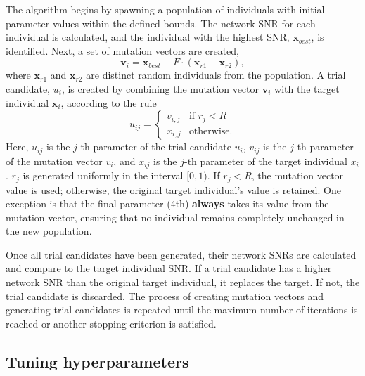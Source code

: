 The algorithm begins by spawning a population of individuals with initial parameter values within the defined bounds. The network SNR for each individual is calculated, and the individual with the highest SNR, \( \mathbf{x}_{best} \), is identified. Next, a set of mutation vectors are created,
%
\begin{equation}
    \mathbf{v}_i = \mathbf{x}_{best} + F \cdot (\mathbf{x}_{r1} - \mathbf{x}_{r2}),
\end{equation}
%
where \( \mathbf{x}_{r1} \) and \( \mathbf{x}_{r2} \) are distinct random individuals from the population. A trial candidate, \( u_i \), is created by combining the mutation vector \( \mathbf{v}_i \) with the target individual \( \mathbf{x}_i \), according to the rule
%
\begin{equation}
    u_{ij} = 
    \begin{cases} 
    v_{i,j} & \text{if } r_j < R \\ 
    x_{i,j} & \text{otherwise}.
    \end{cases}
\end{equation}
%
Here, \( u_{ij} \) is the \( j \)-th parameter of the trial candidate \( u_i \), \( v_{ij} \) is the \( j \)-th parameter of the mutation vector \( v_i \), and \( x_{ij} \) is the \( j \)-th parameter of the target individual \( x_i \). \( r_j \) is generated uniformly in the interval \([0, 1)\). If \( r_j < R \), the mutation vector value is used; otherwise, the original target individual's value is retained. One exception is that the final parameter (4th) \textbf{always} takes its value from the mutation vector, ensuring that no individual remains completely unchanged in the new population.

Once all trial candidates have been generated, their network SNRs are calculated and compare to the target individual SNR. If a trial candidate has a higher network SNR than the original target individual, it replaces the target. If not, the trial candidate is discarded. The process of creating mutation vectors and generating trial candidates is repeated until the maximum number of iterations is reached or another stopping criterion is satisfied.

\subsection{\label{7:sec:de_hyperparameter_tuning}Tuning hyperparameters}

